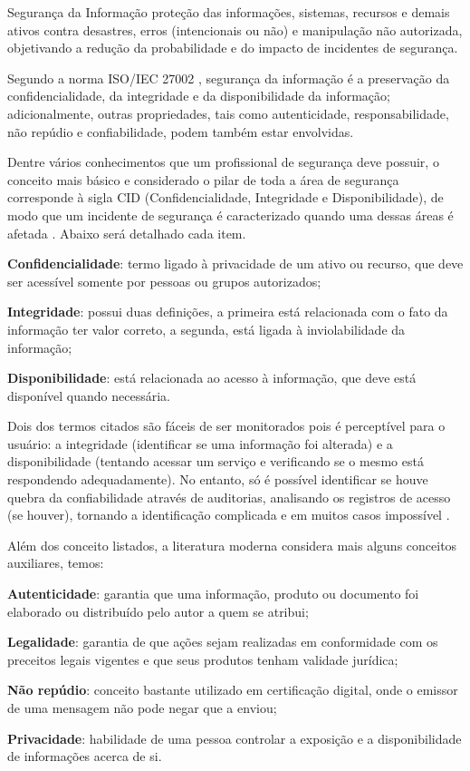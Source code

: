 Segurança da Informação proteção das informações, sistemas, recursos e demais ativos contra desastres, erros (intencionais ou não) e manipulação não autorizada, objetivando a redução da probabilidade e do impacto de incidentes de segurança.

Segundo a norma ISO/IEC 27002 \cite{isoiec27002}, segurança da informação é a preservação da confidencialidade, da integridade e da disponibilidade da informação; adicionalmente, outras propriedades, tais como autenticidade, responsabilidade, não repúdio e confiabilidade, podem também estar envolvidas.

Dentre vários conhecimentos que um profissional de segurança deve possuir, o conceito mais básico e considerado o pilar de toda a área de segurança corresponde à sigla CID (Confidencialidade, Integridade e Disponibilidade), de modo que um incidente de segurança é caracterizado quando uma dessas áreas é afetada \cite{seg-redes-sistemas}. Abaixo será detalhado cada item.

\begin{alineas}
 \item \textbf{Confidencialidade}: termo ligado à privacidade de um ativo ou recurso, que deve ser acessível somente por pessoas ou grupos autorizados;
 \item \textbf{Integridade}: possui duas definições, a primeira está relacionada com o fato da informação ter valor correto, a segunda, está ligada à inviolabilidade da informação;
 \item \textbf{Disponibilidade}: está relacionada ao acesso à informação, que deve está disponível quando necessária.
\end{alineas}

Dois dos termos citados são fáceis de ser monitorados pois é perceptível para o usuário: a integridade (identificar se uma informação foi alterada) e a disponibilidade (tentando acessar um serviço e verificando se o mesmo está respondendo adequadamente). No entanto, só é possível identificar se houve quebra da confiabilidade através de auditorias, analisando os registros de acesso (se houver), tornando a identificação complicada e em muitos casos impossível \cite{seg-redes-sistemas}.

Além dos conceito listados, a literatura moderna considera mais alguns conceitos auxiliares, temos:

\begin{alineas}
 \item \textbf{Autenticidade}: garantia que uma informação, produto ou documento foi elaborado ou distribuído pelo autor a quem se atribui;
 \item \textbf{Legalidade}: garantia de que ações sejam realizadas em conformidade com os preceitos legais vigentes e que seus produtos tenham validade jurídica;
 \item \textbf{Não repúdio}: conceito bastante utilizado em certificação digital, onde o emissor de uma mensagem não pode negar que a enviou;
 \item \textbf{Privacidade}: habilidade de uma pessoa controlar a exposição e a disponibilidade de informações acerca de si.
\end{alineas}

